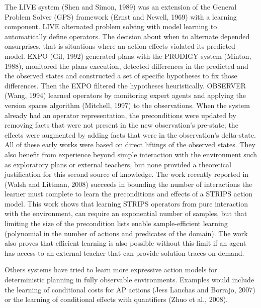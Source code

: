 \documentclass[letterpaper]{article} %
\begin{document}
The  LIVE  system  (Shen  and  Simon,  1989)  was  an  extension  of  the  General  Problem  Solver  (GPS) framework (Ernst and Newell, 1969) with a learning component. LIVE alternated problem solving with model  learning  to  automatically  define  operators.  The  decision  about  when  to  alternate  depended  onsurprises,  that  is  situations  where  an  action  effects  violated  its  predicted  model.  EXPO  (Gil,  1992) generated plans with the  PRODIGY  system (Minton, 1988), monitored the plans execution, detected differences in the predicted and the observed states and constructed a set of specific hypotheses to fix those differences. Then the  EXPO  filtered the hypotheses heuristically.  OBSERVER  (Wang, 1994) learned operators by monitoring expert agents and applying the version spaces algorithm (Mitchell, 1997) to the observations. When the system already had an operator representation, the preconditions were updated by removing facts that were not present in the new observation’s pre-state; the effects were augmented by adding facts that were in the observation’s delta-state. All of these early works were based on direct liftings of the observed states. They also benefit from experience beyond simple interaction with the environment such as exploratory plans or external teachers, but  none  provided  a  theoretical  justification  for  this  second  source  of  knowledge.  The  work  recently reported in (Walsh and Littman, 2008) succeeds in bounding the number of interactions the learner must complete to learn the preconditions and effects of a STRIPS action model. This work shows that learning STRIPS  operators  from  pure  interaction  with  the  environment,  can  require  an  exponential  number  of samples, but that limiting the size of the precondition lists enable sample-efficient learning (polynomial in the number of actions and predicates of the domain). The work also proves that efficient learning is also possible without this limit if an agent has access to an external teacher that can provide solution traces on demand.

Others systems have tried to learn more expressive action models for deterministic planning in fully observable environments. Examples would include the learning of conditional costs for AP actions (Jess Lanchas and Borrajo, 2007) or the learning of conditional effects with quantifiers (Zhuo et al., 2008).
\end{document}
